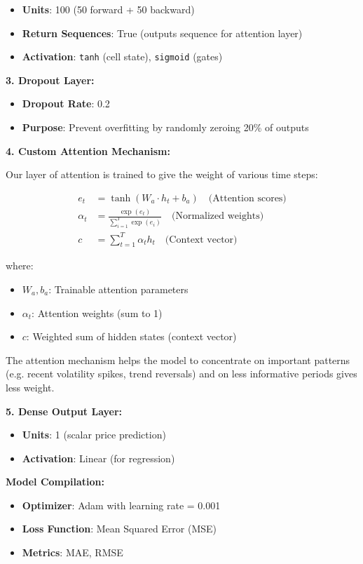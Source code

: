 \begin{itemize}
    \item \textbf{Units}: 100 (50 forward + 50 backward)
    \item \textbf{Return Sequences}: True (outputs sequence for attention layer)
    \item \textbf{Activation}: \texttt{tanh} (cell state), \texttt{sigmoid} (gates)
\end{itemize}

\textbf{3. Dropout Layer:}
\begin{itemize}
    \item \textbf{Dropout Rate}: 0.2
    \item \textbf{Purpose}: Prevent overfitting by randomly zeroing 20\% of outputs
\end{itemize}

\textbf{4. Custom Attention Mechanism:}

Our layer of attention is trained to give the weight of various time steps:

\begin{align}
e_t &= \tanh(W_a \cdot h_t + b_a) \quad \text{(Attention scores)} \\
\alpha_t &= \frac{\exp(e_t)}{\sum_{i=1}^{T} \exp(e_i)} \quad \text{(Normalized weights)} \\
c &= \sum_{t=1}^{T} \alpha_t h_t \quad \text{(Context vector)}
\end{align}

where:
\begin{itemize}
    \item $W_a, b_a$: Trainable attention parameters
    \item $\alpha_t$: Attention weights (sum to 1)
    \item $c$: Weighted sum of hidden states (context vector)
\end{itemize}

The attention mechanism helps the model to concentrate on important patterns (e.g. recent volatility spikes, trend reversals) and on less informative periods gives less weight.

\textbf{5. Dense Output Layer:}
\begin{itemize}
    \item \textbf{Units}: 1 (scalar price prediction)
    \item \textbf{Activation}: Linear (for regression)
\end{itemize}

\textbf{Model Compilation:}
\begin{itemize}
    \item \textbf{Optimizer}: Adam with learning rate = 0.001
    \item \textbf{Loss Function}: Mean Squared Error (MSE)
    \item \textbf{Metrics}: MAE, RMSE
\end{itemize}

